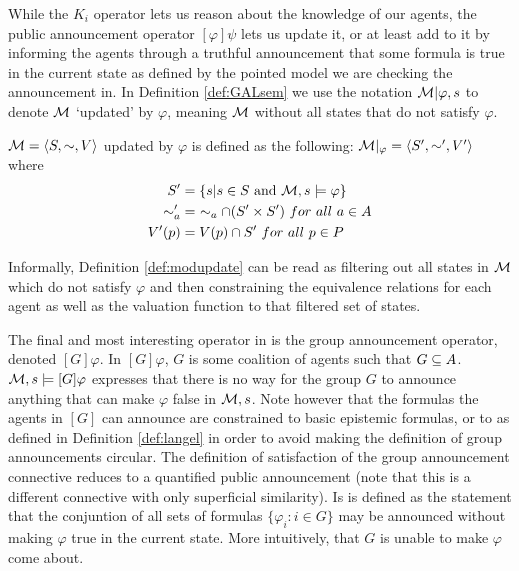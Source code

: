 While the $K_i$ operator lets us reason about the knowledge of our agents, the public announcement operator $[\varphi]\psi$ lets us update it, or at least add to it by informing the agents through a truthful announcement that some formula is true in the current state as defined by the pointed model we are checking the announcement in.
In Definition \ref{def:GALsem} we use the notation $\mathcal{M}|\varphi,s$ to denote $\mathcal{M}$ `updated' by $\varphi$, meaning $\mathcal{M}$ without all states that do not satisfy $\varphi$.

\begin{definition}
	\label{def:modupdate}
	$\mathcal{M} = \langle S,\sim,V\rangle$ updated by $\varphi$ is defined as the following: $\mathcal{M}|_\varphi = \langle S',\sim',V'\rangle$ where 
	\begin{align*}
			S' &= \{s| s\in S\textrm{ and }\mathcal{M},s \models\varphi\} \\
			\sim_a' &= ~\sim_a \cap (S' \times S')~ for ~ all ~ a\in A\\
			V'(p) &= V(p) \cap S'~ for ~ all ~ p \in P
	\end{align*}
\end{definition}

Informally, Definition \ref{def:modupdate} can be read as filtering out all states in $\mathcal{M}$ which do not satisfy $\varphi$ and then constraining the equivalence relations for each agent as well as the valuation function to that filtered set of states.

The final and most interesting operator in  is the group announcement operator, denoted $[G]\varphi$. In $[G]\varphi$, $G$ is some coalition of agents such that $G \subseteq A$. $\mathcal{M},s \models [G]\varphi$ expresses that there is no way for the group $G$ to announce anything that can make $\varphi$ false in $\mathcal{M},s$. Note however that the formulas the agents in $[G]$ can announce are constrained to basic epistemic formulas, or to  as defined in Definition \ref{def:langel} in order to avoid making the definition of group announcements circular. The definition of satisfaction of the group announcement connective reduces to a quantified public announcement (note that this is a different connective with only superficial similarity). Is is defined as the statement that the conjuntion of all sets of formulas $\{\varphi_i:i\in G\}$ may be announced without making $\varphi$ true in the current state. More intuitively, that $G$ is unable to make $\varphi$ come about.

